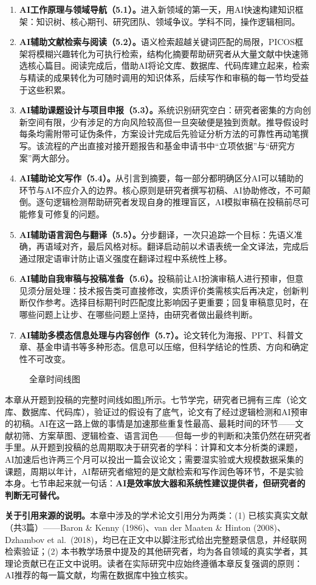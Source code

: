 \begin{enumerate}[label=\arabic*.]
\setlength{\itemsep}{3pt}
\item \textbf{AI工作原理与领域导航（5.1）。}进入新领域的第一天，用AI快速构建知识框架：知识树、核心期刊、研究团队、领域争议。学科不同，操作逻辑相同。
\item \textbf{AI辅助文献检索与阅读（5.2）。}语义检索超越关键词匹配的局限，PICOS框架将模糊兴趣转化为可执行检索，结构化摘要帮助研究者从大量文献中快速筛选核心篇目。阅读完成后，借助AI将论文库、数据库、代码库建立起来，检索与精读的成果转化为可随时调用的知识体系，后续写作和审稿的每一节均受益于这些积累。
\item \textbf{AI辅助课题设计与项目申报（5.3）。}系统识别研究空白：研究者密集的方向创新空间有限，少有涉足的方向风险较高但一旦突破便是独到贡献。推导假设时每条均需附带可证伪条件，方案设计完成后先验证分析方法的可靠性再动笔撰写。该流程的产出直接对接开题报告和基金申请书中``立项依据''与``研究方案''两大部分。
\item \textbf{AI辅助论文写作（5.4）。}从引言到摘要，每一部分都明确区分AI可以辅助的环节与AI不应介入的边界。核心原则是研究者撰写初稿、AI协助修改，不可颠倒。逐句逻辑检测帮助研究者发现自身的推理盲区，AI模拟审稿在投稿前尽可能修复可修复的问题。
\item \textbf{AI辅助语言润色与翻译（5.5）。}分步翻译，一次只追踪一个目标：先语义准确，再语域对齐，最后风格对标。翻译启动前以术语表统一全文译法，完成后通过限定语审计防止语义强度在翻译过程中系统性上移。
\item \textbf{AI辅助自我审稿与投稿准备（5.6）。}投稿前让AI扮演审稿人进行预审，但意见须分层处理：技术报告类可直接修改，实质评价类需核实后再决定，创新判断仅作参考。选择目标期刊时匹配度比影响因子更重要；回复审稿意见时，在哪些问题上让步、在哪些问题上坚持，由研究者做出最终判断。
\item \textbf{AI辅助多模态信息处理与内容创作（5.7）。}论文转化为海报、PPT、科普文章、基金申请书等多种形态。信息可以压缩，但科学结论的性质、方向和确定性不可改变。
\end{enumerate}

\begin{figure}[H]
\centering
{}
\caption{全章时间线图}
\label{fig:ch5_12}
\end{figure}
\par

本章从开题到投稿的完整时间线如图\ref{fig:ch5_12}所示。七节学完，研究者已拥有三库（论文库、数据库、代码库），验证过的假设有了底气，论文有了经过逻辑检测和AI预审的初稿。AI在这一路上做的事情是加速那些重复性最高、最耗时间的环节——文献初筛、方案草图、逻辑检查、语言润色——但每一步的判断和决策仍然在研究者手里。从开题到投稿的总周期取决于研究者的学科：计算和文本分析类的课题，AI加速后也许两三个月可以投出一篇会议论文；需要湿实验或大规模数据采集的课题，周期以年计，AI帮研究者缩短的是文献检索和写作润色等环节，不是实验本身。七节串起来就一句话：\textbf{AI是效率放大器和系统性建议提供者，但研究者的判断无可替代。}


\medskip
\textbf{关于引用来源的说明。}本章中涉及的学术论文引用分为两类：(1) 已核实真实文献（共3篇）——Baron \& Kenny (1986)、van der Maaten \& Hinton (2008)、Dzhambov et al.\ (2018)，均已在正文中以脚注形式给出完整题录信息，并经联网检索验证；(2) 本书教学场景中提及的其他研究者，均为各自领域的真实学者，其理论贡献已在正文中说明。读者在实际研究中应始终遵循本章反复强调的原则：AI推荐的每一篇文献，均需在数据库中独立核实。